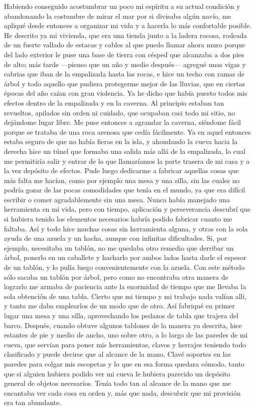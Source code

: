 \documentclass{novela}
\begin{document}
    Habiendo conseguido acostumbrar un poco mi espíritu a su actual condición y abandonando la costumbre de mirar el mar por si divisaba algún navío, me apliqué desde entonces a organizar mi vida y a hacerla lo más confortable posible.
    He descrito ya mi vivienda, que era una tienda junto a la ladera rocosa, rodeada de un fuerte vallado de estacas y cables al que puedo llamar ahora muro porque del lado exterior le puse una base de tierra con césped que alcanzaba a dos pies de alto; más tarde —pienso que un año y medio después— agregué unas vigas y cabrias que iban de la empalizada hasta las rocas, e hice un techo con ramas de árbol y todo aquello que pudiera protegerme mejor de las lluvias, que en ciertas épocas del año caían con gran violencia.
    Ya he dicho que había puesto todos mis efectos dentro de la empalizada y en la caverna. Al principio estaban tan revueltos, apilados sin orden ni cuidado, que ocupaban casi todo mi sitio, no dejándome lugar libre. Me puse entonces a agrandar la caverna, siéndome fácil porque se trataba de una roca arenosa que cedía fácilmente. Ya en aquel entonces estaba seguro de que no había fieras en la isla, y ahondando la cueva hacia la derecha hice un túnel que formaba una salida más allá de la empalizada, lo cual me permitiría salir y entrar de lo que llamaríamos la parte trasera de mi casa y a la vez depósito de efectos.
    Pude luego dedicarme a fabricar aquellas cosas que más falta me hacían, como por ejemplo una mesa y una silla, sin las cuales no podría gozar de las pocas comodidades que tenía en el mundo, ya que era difícil escribir o comer agradablemente sin una mesa. Nunca había manejado una herramienta en mi vida, pero con tiempo, aplicación y perseverancia descubrí que si hubiera tenido los elementos necesarios habría podido fabricar cuanto me faltaba. Así y todo hice muchas cosas sin herramienta alguna, y otras con la sola ayuda de una azuela y un hacha, aunque con infinitas dificultades. Si, por ejemplo, necesitaba un tablón, no me quedaba otro remedio que derribar un árbol, ponerlo en un caballete y hacharlo por ambos lados hasta darle el espesor de un tablón, y lo pulía luego convenientemente con la azuela. Con este método sólo sacaba un tablón por árbol, pero como no encontraba otra manera de lograrlo me armaba de paciencia ante la enormidad de tiempo que me llevaba la sola obtención de una tabla. Cierto que mi tiempo y mi trabajo nada valían allí, y tanto me daba emplearlos de un modo que de otro.
    Así fabriqué en primer lugar una mesa y una silla, aprovechando los pedazos de tabla que trajera del barco. Después, cuando obtuve algunos tablones de la manera ya descrita, hice estantes de pie y medio de ancho, uno sobre otro, a lo largo de las paredes de mi cueva, que servían para poner mis herramientas, clavos y herrajes teniendo todo clasificado y puede decirse que al alcance de la mano. Clavé soportes en las paredes para colgar mis escopetas y lo que en esa forma quedara cómodo, tanto que si alguien hubiera podido ver mi cueva le hubiera parecido un depósito general de objetos necesarios. Tenía todo tan al alcance de la mano que me encantaba ver cada cosa en orden y, más que nada, descubrir que mi provisión era tan abundante.
\end{document}
